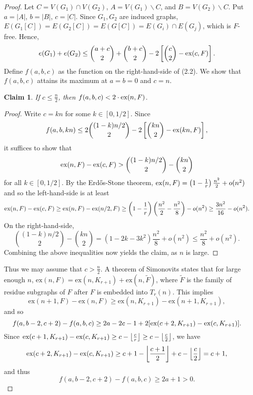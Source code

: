 \documentclass[12pt]{report}
\newtheorem{claim}{Claim}
\begin{document}
\begin{proof}
  Let $C = V(G_1) \cap V(G_2)$, $A = V(G_1) \backslash C$, and $B = V(G_2) \backslash C$. Put $a =
  |A|$, $b = |B|$, $c = |C|$. Since $G_1, G_2$ are induced graphs, $E(G_1[C]) =
  E(G_2[C]) = E(G[C]) = E(G_i) \cap E(G_j)$, which is $F$-free. Hence, 
  \begin{gather}
    e(G_1) + e(G_2) \leq \binom{a + c}{2} +  \binom{b + c}{2} - 2\left[\binom{c}{2} - \textnormal{ex}(c, F)\right].
  \end{gather}
  Define $f(a, b, c)$ as the function on the right-hand-side of (2.2). We show that $f(a, b, c)$
  attains its maximum at $a = b = 0$ and $c = n$. 

  \begin{claim}
    If $c \leq \frac{n}{2}$, then $f(a, b, c) < 2 \cdot \textnormal{ex}(n, F)$.
  \end{claim}

  \begin{proof}
    Write $c = kn$ for some $k \in [0, 1/2]$. Since
    \[
      f(a, b, kn) \leq 2\binom{(1 - k)n/2}{2} - 2\left[\binom{kn}{2} - \textnormal{ex}(kn, F)\right],
    \]
    it suffices to show that
    \[
      \textnormal{ex}(n, F) - \textnormal{ex}(c, F) > \binom{(1 - k)n/2}{2} - \binom{kn}{2}
    \]
    for all $k \in [0, 1/2]$. By the Erdős-Stone theorem, $\textnormal{ex}(n, F) = \left(1 -
    \frac{1}{r}\right)\frac{n^2}{2} + o(n^2)$ and so the left-hand-side is at least
    \[
      \textnormal{ex}(n, F) - \textnormal{ex}(c, F) \geq \textnormal{ex}(n, F) - \textnormal{ex}(n/2, F) \geq \left(1 - \frac{1}{r}\right)\left(\frac{n^2}{2} - \frac{n^2}{8}\right) - o(n^2) \geq \frac{3n^2}{16} - o(n^2).
    \]
    On the right-hand-side, 
    \[
      \binom{(1 - k)n/2}{2} - \binom{kn}{2} = (1 - 2k - 3k^2)\frac{n^2}{8} + o(n^2) \leq \frac{n^2}{8} + o(n^2).
    \]
    Combining the above inequalities now yields the claim, as $n$ is large.
  \end{proof}
  Thus we may assume that $c > \frac{n}{2}$. A theorem of Simonovits states that for large enough
  $n$, $\text{ex}(n, F) = \text{ex}(n, K_{r + 1}) + \text{ex}(n, \tilde{F})$, where $\tilde{F}$ is
  the family of residue subgraphs of $F$ after $F$ is embedded into $T_r(n)$. This implies 
  \[
    \text{ex}(n + 1, F) - \text{ex}(n, F) \geq \text{ex}(n, K_{r + 1}) - \text{ex}(n + 1, K_{r + 1}),
  \]
  and so
  \[
    f(a, b - 2, c + 2) - f(a, b, c) \geq 2a - 2c - 1 + 2[\textnormal{ex}(c + 2, K_{r + 1}) - \textnormal{ex}(c, K_{r + 1})].
  \]
  Since $\textnormal{ex}(c + 1, K_{r + 1}) - \textnormal{ex}(c, K_{r + 1}) \geq c - \left\lfloor
  \frac{c}{r} \right\rfloor \geq c - \left\lfloor \frac{c}{2} \right\rfloor$, we have
  \[
    \textnormal{ex}(c + 2, K_{r + 1}) - \textnormal{ex}(c, K_{r + 1}) \geq c + 1 - \left\lfloor \frac{c + 1}{2} \right\rfloor + c - \left\lfloor \frac{c}{2} \right\rfloor = c + 1,
  \]
  and thus 
  \[
    f(a, b - 2, c + 2) - f(a, b, c) \geq 2a + 1 > 0.
  \]


\end{proof}
\end{document}
